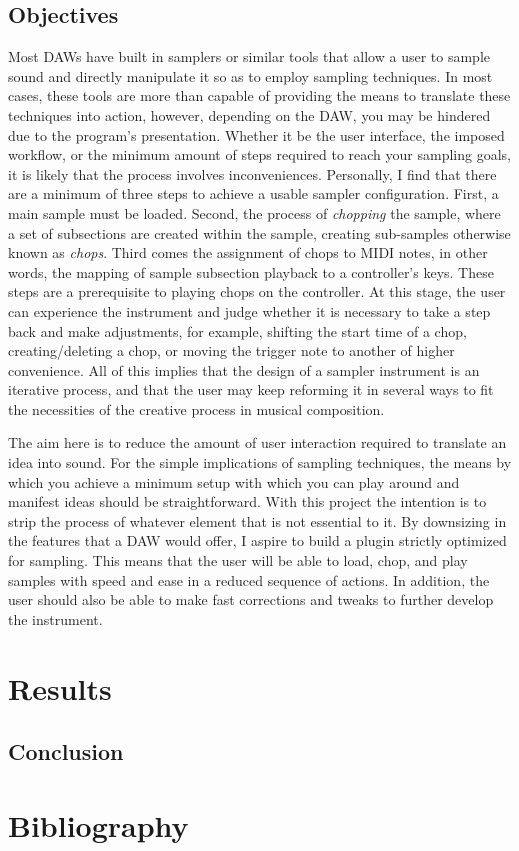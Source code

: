 \documentclass[12pt , a4paper]{article}
\begin{document}
	\subsection{Objectives}
	Most DAWs have built in samplers or similar tools that allow a user to sample sound and directly manipulate it so as to employ sampling techniques. In most cases, these tools are more than capable of providing the means to translate these techniques into action, however, depending on the DAW, you may be hindered due to the program's presentation. Whether it be the user interface, the imposed workflow, or the minimum amount of steps required to reach your sampling goals, it is likely that the process involves inconveniences. Personally, I find that there are a minimum of three steps to achieve a usable sampler configuration. First, a main sample must be loaded. Second, the process of \textit{chopping} the sample, where a set of subsections are created within the sample, creating sub-samples otherwise known as \textit{chops}. Third comes the assignment of chops to MIDI notes, in other words, the mapping of sample subsection playback to a controller's keys. These steps are a prerequisite to playing chops on the controller. At this stage, the user can experience the instrument and judge whether it is necessary to take a step back and make adjustments, for example, shifting the start time of a chop, creating/deleting a chop, or moving the trigger note to another of higher convenience. All of this implies that the design of a sampler instrument is an iterative process, and that the user may keep reforming it in several ways to fit the necessities of the creative process in musical composition.
	\par	
	The aim here is to reduce the amount of user interaction required to translate an idea into sound. For the simple implications of sampling techniques, the means by which you achieve a minimum setup with which you can play around and manifest ideas should be straightforward. With this project the intention is to strip the process of whatever element that is not essential to it. By downsizing in the features that a DAW would offer, I aspire to build a plugin strictly optimized for sampling. This means that the user will be able to load, chop, and play samples with speed and ease in a reduced sequence of actions. In addition, the user should also be able to make fast corrections and tweaks to further develop the instrument. 
	
	\newpage
	\section{Results}
	
	\subsection{Conclusion}
	 
	\newpage
	\section{Bibliography}
	
\end{document}
